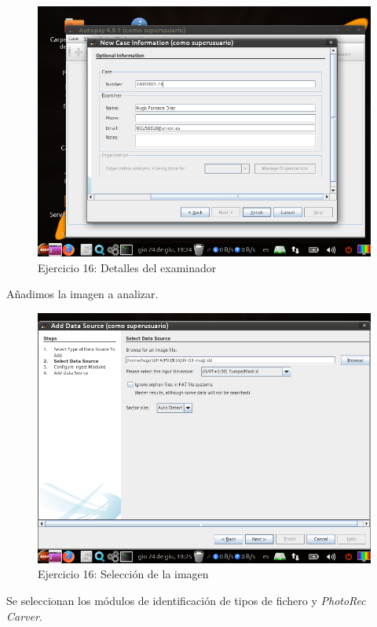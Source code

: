 \documentclass[11pt]{article}
\begin{document}
\begin{figure}[H]
    \caption{Ejercicio 16: Detalles del examinador}
    \centering
    \includegraphics[scale=0.7]{e16-2.png}
\end{figure}

Añadimos la imagen a analizar.

\begin{figure}[H]
    \caption{Ejercicio 16: Selección de la imagen}
    \centering
    \includegraphics[scale=0.7]{e16-3.png}
\end{figure}

Se seleccionan los módulos de identificación de tipos de fichero y \textit{PhotoRec Carver}.
\end{document}

